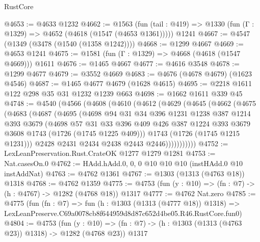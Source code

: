 \begin{lexlean}{RustCore}
\begin{coremodule}
@4653 := @4633 @1232
@4662 := @1563
    (fun (tail : @419) => @1330 (fun (Γ : @1329) => @4652 (@4618 (@1547 (@4653 @1361)))))
    @1241
@4667 := @4547 (@1349 (@3478 (@1540 (@1358 @1242))))
@4668 := @1299 @4667
@4669 := @4653 @1241
@4675 := @1581 (fun (Γ : @1329) => @4668 (@4618 (@1547 @4669))) @1611
@4676 := @1465 @4667
@4677 := @4616 @3548
@4678 := @1299 @4677
@4679 := @3552 @4669
@4683 := @4676 (@4678 @4679) (@1623 @4546)
@4687 := @1465 @4677 @4679 (@1628 @4615)
@4695 := @2218 @1611 @122 @298 @35 @31 @1232 @1239 @663
@4698 := @1662 @1611 @339 @45
@4748 := @4540
    (@4566
      (@4608
        (@4610
          (@4612
            (@4629
              (@4645
                (@4662
                  (@4675
                    (@4683
                      (@4687
                        (@4695
                          (@4698
                            @94
                            @31
                            @34
                            @396
                            @1231
                            @1238
                            @387
                            @1214
                            @393
                            @3679
                            (@4698
                              @57
                              @31
                              @33
                              @396
                              @409
                              @426
                              @387
                              @1224
                              @393
                              @3679
                              @3608
                              @1743
                              (@1726 (@1745 @1225 @409)))
                            @1743
                            (@1726 (@1745 @1215 @1231)))
                          @2428
                          @2431
                          @2434
                          @2438
                          @2443
                          @2446)))))))))))
@4752 := LexLeanPreservation.Rust.CrateOK @1277 @1279 @1281
@4753 := Nat.casesOn.{0}
@4762 := HAdd.hAdd.{0, 0, 0} @10 @10 @10 (instHAdd.{0} @10 instAddNat)
@4763 := @4762 @1361
@4767 := @1303 (@1313 (@4763 @18)) @1318
@4768 := @4762 @1359
@4775 := @4753 (fun (y : @10) => (fn : @7) -> (h : @4767) -> @1282 (@4768 @18)) @1317
@4777 := @4762 Nat.zero
@4785 := @4775
    (fun (fn : @7) =>
    fun (h : @1303 (@1313 (@4777 @18)) @1318) =>
    LexLeanPreserve.C69a0078cb8f644959d8d87c652d4be05.R46.RustCore.fun0)
@4804 := @4753
    (fun (y : @10) => (fn : @7) -> (h : @1303 (@1313 (@4763 @23)) @1318) -> @1282 (@4768 @23))
    @1317

\end{coremodule}
\end{lexlean}
